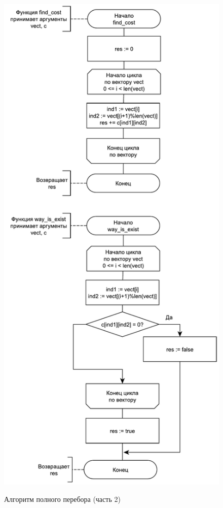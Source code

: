 \begin{figure}[h]
	\begin{center}
		{\includegraphics[scale = 0.6]{schemes/full2}}
		\caption{Алгоритм полного перебора (часть 2)}
		\label{fig2:image}
	\end{center}
\end{figure}

